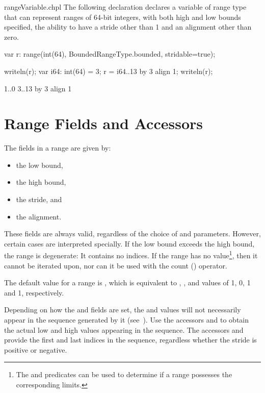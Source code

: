 \begin{chapelexample}{rangeVariable.chpl}
The following declaration declares a variable 
of range type that can represent ranges of 64-bit integers, with both
high and low bounds specified, the ability to have a stride other
than 1 and an alignment other than zero.
\begin{chapel}
var r: range(int(64), BoundedRangeType.bounded, stridable=true);
\end{chapel}
\begin{chapelpost}
writeln(r);
var i64: int(64) = 3;
r = i64..13 by 3 align 1;
writeln(r);
\end{chapelpost}
\begin{chapeloutput}
1..0
3..13 by 3 align 1
\end{chapeloutput}
\end{chapelexample}

\section{Range Fields and Accessors}
\label{Range_Fields}

The fields in a range are given by:
\begin{itemize}
\item[\chpl{low}] the low bound,
\item[\chpl{high}] the high bound,
\item[\chpl{stride}] the stride, and
\item[\chpl{alignment}] the alignment.
\end{itemize}
These fields are always valid, regardless of the choice of 
and  parameters.  However, certain cases are interpreted
specially.  If the low bound exceeds the high bound, the range is degenerate: It contains no
indices.  If the range has no  value\footnote{The 
and  predicates can be used to determine if a range possesses the
corresponding limits.}, then it cannot be iterated
upon, nor can it be used with the count (\chpl{\#}) operator.

The default value for a range is , which is equivalent to , , 
and  values of 1, 0, 1 and 1, respectively.

Depending on how the  and  fields are set,
the  and  values will not necessarily appear in the
sequence generated by it (see~).  Use the
accessors  and  to obtain the actual low and
high values appearing in the sequence.  The accessors  and  provide
the first and last indices in the sequence, regardless whether the stride is
positive or negative.  

